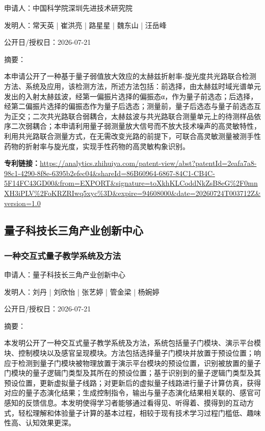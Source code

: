\documentclass[12pt,a4paper]{ctexart}
\begin{document}
申请人：中国科学院深圳先进技术研究院

发明人：常天英 | 崔洪亮 | 路星星 | 魏东山 | 汪岳峰

公开日/授权日：2026-07-21

摘要：

本申请公开了一种基于量子弱值放大效应的太赫兹折射率‑旋光度共光路联合检测方法、系统及应用，该检测方法，所述方法包括：前选择，由太赫兹时域光谱单元发出的入射太赫兹波，经第一偏振片选择的偏振态α，作为量子前选态；后选择，经第二偏振片选择的偏振态作为量子后选态；测量前，量子后选态与量子前选态互为正交；二次共光路联合弱耦合，太赫兹波与共光路联合测量单元上的待测样品依序二次弱耦合；本申请利用量子弱测量放大信号而不放大技术噪声的高灵敏特性，利用共光路联合测量方式，在无需改变光路的前提下，可联合高灵敏测量被测手性药物的折射率与旋光度，实现手性药物的高灵敏构象识别。

\noindent\textbf{专利链接：}\url{https://analytics.zhihuiya.com/patent-view/abst?patentId=2eafa7a8-98c1-4290-8f8e-6395b2efec04&shareId=86B60964-6867-84C1-CB4C-5F14FC43GD00&from=EXPORT&signature=toXkhKLCoddNkZsB8eG%2F0mnXH3iPLV%2FoKRZRIwq5xyc%3D&expire=94608000&date=20260724T003712Z&version=1.0}


\subsection{ 量子科技长三角产业创新中心 }

\subsubsection{ 一种交互式量子教学系统及方法 }

申请人：量子科技长三角产业创新中心

发明人：刘丹 | 刘欣怡 | 张艺婷 | 管金梁 | 杨婉婷

公开日/授权日：2026-07-21

摘要：

本发明公开了一种交互式量子教学系统及方法，系统包括量子门模块、演示平台模块、控制模块以及感官呈现模块。方法包括选择量子门模块并放置于预设位置；响应于检测到量子门模块被物理放置于演示平台模块的预设位置，识别被放置的量子门模块的量子逻辑门类型及其所在的预设位置；基于识别到的量子逻辑门类型及其预设位置，更新虚拟量子线路；对更新后的虚拟量子线路进行量子计算仿真，获得对应的量子态演化结果；生成控制指令，输出与量子态演化结果相关联的、感官可感知的反馈信息。本发明使得学习者能够通过看得见、听得着、摸得到的互动方式，轻松理解和体验量子计算的基本过程，相较于现有技术学习过程门槛低、趣味性高、认知效果更深。
\end{document}
